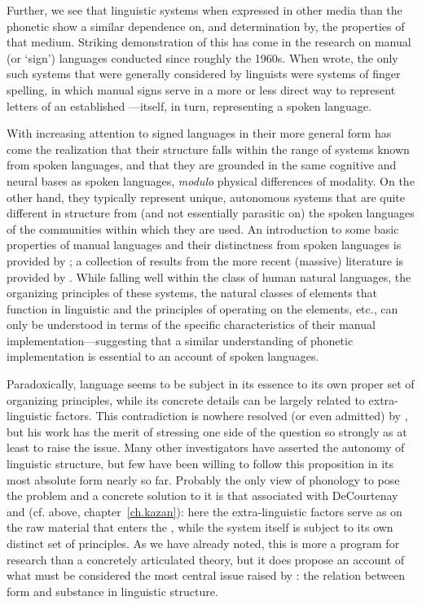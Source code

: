 Further, we see that linguistic systems when expressed in other media
than the phonetic show a similar dependence on, and determination by,
the properties of that medium. Striking demonstration of this has come
in the research on manual (or `sign') languages conducted since
roughly the 1960s. When {\Hjelmslev} wrote, the only such systems that
were generally considered by linguists were systems of finger
spelling, in which manual signs serve in a more or less direct way to
represent letters of an established —itself, in turn,
representing a spoken language.

With increasing attention to signed languages in their more general
form has come the realization that their structure falls within the
range of systems known from spoken languages, and that they are
grounded in the same cognitive and neural bases as spoken languages,
\emph{modulo} physical differences of modality. On the other hand,
they typically represent unique, autonomous systems that are quite
different in structure from (and not essentially parasitic on) the
spoken languages of the communities within which they are used. An
introduction to some basic properties of manual languages and their
distinctness from spoken languages is provided by
\citet{bellugi.klima79:sign}; a collection of results from the more
recent (massive) literature is provided by
\citet{brentari10:sign-languages}. While falling well within the class
of human natural languages, the organizing principles of these
systems, the natural classes of elements that function in linguistic
 and the principles of  operating on the
elements, etc., can only be understood in terms of the specific
characteristics of their manual implementation—suggesting that a
similar understanding of phonetic implementation is essential to an
account of spoken languages.

Paradoxically, language seems to be subject in its essence to its own
proper set of organizing principles, while its concrete details can be
largely related to extra-linguistic factors. This contradiction is
nowhere resolved (or even admitted) by {\Hjelmslev}, but his work has the
merit of stressing one side of the question so strongly as at least to
raise the issue. Many other investigators have asserted the autonomy
of linguistic structure, but few have been willing to follow this
proposition in its most absolute form nearly so far. Probably the only
view of phonology to pose the problem and a concrete solution to it is
that associated with {DeCourtenay} and {\Kruszewski} (cf. above,
chapter~\ref{ch.kazan}): here the extra-linguistic factors serve as
 on the raw material that enters the ,
while the system itself is subject to its own distinct set of
principles. As we have already noted, this is more a program for
research than a concretely articulated theory, but it does propose an
account of what must be considered the most central issue raised by
{\Hjelmslev}: the relation between form and substance in linguistic
structure.

